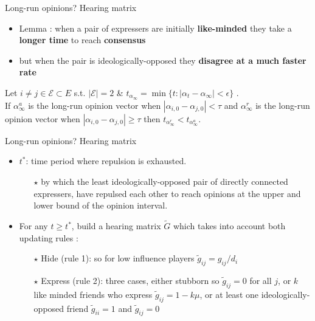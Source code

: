 \documentclass[xcolor=table,handout]{beamer}
\begin{document}
\begin{frame}{Long-run opinions? Hearing matrix}
\begin{itemize} \setlength\itemsep{1em}
	\item Lemma : when a pair of expressers are initially {\bf\color{purple}like-minded} they take a {\bf\color{purple}longer time} to reach {\bf\color{purple}consensus} 
	\item but when the pair is ideologically-opposed they {\bf\color{purple}disagree at a much faster rate}
\end{itemize}
	\begin{tcolorbox}[enhanced,attach boxed title to top center={yshift=-3mm,yshifttext=-1mm}, colback=red!3,colframe=red!40,colbacktitle=red!40, title=Lemma ,fonttitle=\bfseries, boxed title style={size=small,colframe=red!50} ]  Let $i \neq j \in \mathcal{E} \subset E$ s.t. $|\mathcal{E}|=2$ \& $t_{\alpha_{\infty }} = \min \{ t : | \alpha_{t} - \alpha_{\infty } | < \epsilon  \} $ . \\ 
	If $\alpha_{\infty}^a$ is the long-run opinion vector when $|\alpha_{i,0} - \alpha_{j,0} | < \tau$ and $\alpha^r_{\infty}$ is the long-run opinion vector when $|\alpha_{i,0} - \alpha_{j,0} | \geq \tau$ then $t_{\alpha^r_{\infty }} < t_{\alpha^a_{\infty }}$.  \end{tcolorbox}
	

\end{frame}
%
\begin{frame}{Long-run opinions? Hearing matrix}

\begin{itemize}\setlength\itemsep{1em}

\item $t^{*} $:  time period where repulsion is exhausted. \smallskip

	\begin{itemize} \item[$\star$] {\color{gray}by which the least ideologically-opposed pair of directly connected expressers, have repulsed each other to reach opinions at the upper and lower bound of the opinion interval.} \end{itemize}
	\item For any  $t \geq t^{*}$, build a hearing matrix $\tilde{G}$ which takes into account both updating rules : 
		\begin{itemize}\setlength\itemsep{1em}
			\item[$\star$] Hide (rule 1): so for low influence players $\tilde{g}_{ij} = g_{ij} /d_i$ 
			\item[$\star$] Express (rule 2): three cases, either stubborn so $\tilde{g}_{ij} = 0$ for all $j$, or $k$  like minded friends who express $\tilde{g}_{ij} = 1 - k\mu$, or at least one ideologically-opposed friend $\tilde{g}_{ii} = 1$ and $\tilde{g}_{ij} = 0$
		\end{itemize}
		\end{itemize}

\end{frame}
\end{document}
